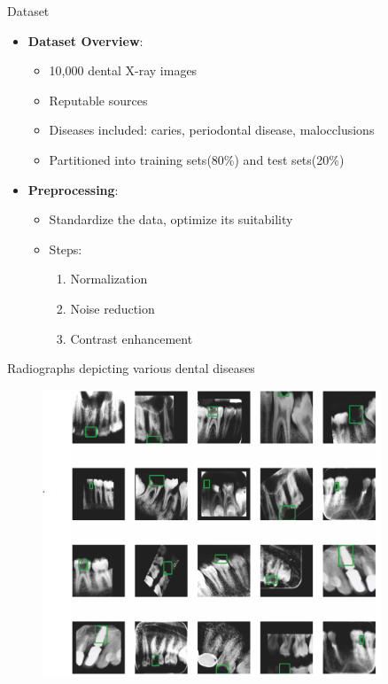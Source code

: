 \documentclass{beamer}
\begin{document}
\begin{frame}{Dataset}
	\begin{itemize}
		\vfill
		\item \textbf{Dataset Overview}:
		\begin{itemize}
			\item 10,000 dental X-ray images
			\item Reputable sources
			\item Diseases included: caries, periodontal disease, malocclusions
			\item Partitioned into training sets(80\%) and test sets(20\%)
		\end{itemize}
		\vfill
		\item \textbf{Preprocessing}:
		\begin{itemize}
			\item Standardize the data, optimize its suitability
			\item Steps:
			\begin{enumerate}
				\item Normalization
				\item Noise reduction
				\item Contrast enhancement
			\end{enumerate}
		\end{itemize}
	\end{itemize}
\end{frame}

\begin{frame}{Radiographs depicting various dental diseases}
	\begin{figure}[!t]
		\centerline{\includegraphics[width=0.9\textwidth]{../ss-teeth-full.png}}
	\end{figure}
\end{frame}
\end{document}
